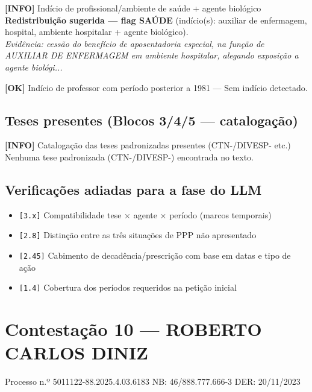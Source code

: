 \documentclass[12pt,a4paper]{article}
\newcommand{\statusOK}[1]{\textcolor{corOK}{\textbf{[OK]}} #1}
\newcommand{\statusINFO}[1]{\textcolor{corINFO}{\textbf{[INFO]}} #1}
\begin{document}
\medskip
\statusINFO{Indício de profissional/ambiente de saúde + agente biológico}\\
\textcolor{corVERIFICAR}{\textbf{Redistribuição sugerida --- flag SAÚDE}} (indício(s): auxiliar de enfermagem, hospital, ambiente hospitalar + agente biológico).
\\
\textit{Evidência: cessão do benefício de aposentadoria especial, na função de AUXILIAR DE ENFERMAGEM em ambiente hospitalar, alegando exposição a agente biológi...}

\medskip
\statusOK{Indício de professor com período posterior a 1981} --- Sem indício detectado.

\subsection{Teses presentes (Blocos 3/4/5 --- catalogação)}

\statusINFO{Catalogação das teses padronizadas presentes (CTN-/DIVESP- etc.)}\\
Nenhuma tese padronizada (CTN-/DIVESP-) encontrada no texto.

\subsection{Verificações adiadas para a fase do LLM}

\begin{itemize}
  \item \texttt{[3.x]} Compatibilidade tese × agente × período (marcos temporais)
  \item \texttt{[2.8]} Distinção entre as três situações de PPP não apresentado
  \item \texttt{[2.45]} Cabimento de decadência/prescrição com base em datas e tipo de ação
  \item \texttt{[1.4]} Cobertura dos períodos requeridos na petição inicial
\end{itemize}



\clearpage
{}
\section{Contestação 10 --- ROBERTO CARLOS DINIZ}
\begin{center}
  {\small Processo n.º 5011122-88.2025.4.03.6183 \quad NB: 46/888.777.666-3 \quad DER: 20/11/2023}
\end{center}
\end{document}
